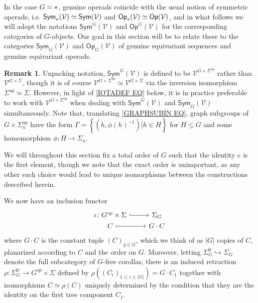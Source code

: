\documentclass[a4paper,10pt
,draft
]{article}%
\numberwithin{equation}{section}
\numberwithin{figure}{section}
\theoremstyle{definition} %
\newtheorem{remark}[equation]{Remark}%
\newcommand{\1}{\ensuremath{\mathbbm 1}}%
\begin{document}
In the case $G = \**$, genuine operads coincide with the usual notion of symmetric operads, i.e. 
$\mathsf{Sym}_{\**}(\mathcal{V})
\simeq \mathsf{Sym}(\mathcal{V})$ 
and
$\mathsf{Op}_{\**}(\mathcal{V})
\simeq \mathsf{Op}(\mathcal{V})$, 
and in what follows we will adopt the notations
$\mathsf{Sym}^G(\mathcal{V})$ and
$\mathsf{Op}^G(\mathcal{V})$ 
for the corresponding categories of $G$-objects.
Our goal in this section will be to relate these to the categories
$\mathsf{Sym}_G(\mathcal{V})$ and $\mathsf{Op}_G(\mathcal{V})$
of genuine equivariant sequences and genuine equivariant operads.

\begin{remark}\label{TOOPORNOT REM}
	Unpacking notation,
	$\mathsf{Sym}^G(\mathcal{V})$ is defined to be
	$\mathcal{V}^{G \times \Sigma^{op}}$
	rather than 
	$\mathcal{V}^{G \times \Sigma}$,
	though it is of course  
	$\mathcal{V}^{G \times \Sigma^{op}}
	\simeq \mathcal{V}^{G \times \Sigma}$
	via the inversion isomorphism
	$\Sigma^{op} \simeq \Sigma$.
%	
	However, in light of \eqref{IOTADEF EQ} below, 
	it is in practice preferable to work with 
	$\mathcal{V}^{G \times \Sigma^{op}}$
	when dealing with $\mathsf{Sym}^G(\mathcal{V})$ and
	$\mathsf{Sym}_G(\mathcal{V})$ simultaneously.
%	
	Note that, translating \eqref{GRAPHSUBIN EQ}, 
	graph subgroups of
	$G \times \Sigma_n^{op}$
	have the form
	$\Gamma = \left\{(h,\phi(h)^{-1})|h\in H\right\}$
	for $H\leq G$
	and some homomorphism $\phi \colon H \to \Sigma_n$. 
\end{remark}


We will throughout this section fix a total order of $G$ such that the identity $e$ is the first element, though we note that the exact order is unimportant, as any other such choice would lead to unique isomorphisms between the constructions described herein.

We now have an inclusion functor
\begin{equation}\label{IOTADEF EQ}
\begin{tikzcd}[row sep =0]
	\iota \colon G^{op} \times \Sigma \ar[hookrightarrow]{r} &
	\Sigma_G
\\
	C \ar[mapsto]{r} & G \cdot C
\end{tikzcd}
\end{equation}
where $G \cdot C$ is the constant tuple $(C)_{g \in G}$,
which we think of as $|G|$ copies of $C$, planarized according to $C$ and the order on $G$.
Moreover, letting $\Sigma_G^{\text{fr}} \hookrightarrow \Sigma_G$ denote the full subcategory of $G$-free corollas, there is an induced retraction 
$\rho \colon \Sigma_{G}^{\text{fr}} \to G^{op} \times \Sigma$
defined by 
$\rho\left( (C_i)_{1\leq i \leq |G|} \right) = G \cdot C_1$
together with isomorphisms 
$C \simeq \rho(C)$
uniquely determined by the condition that they
are the identity on the first tree component $C_1$.
\end{document}
